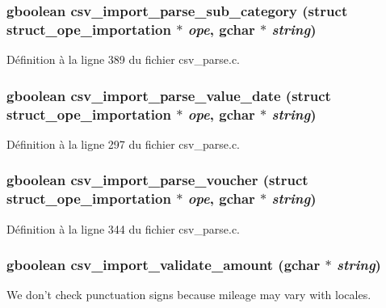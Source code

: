 \subsubsection[{csv\_\-import\_\-parse\_\-sub\_\-category}]{\setlength{\rightskip}{0pt plus 5cm}gboolean csv\_\-import\_\-parse\_\-sub\_\-category (struct {\bf struct\_\-ope\_\-importation} $\ast$ {\em ope}, \/  gchar $\ast$ {\em string})}\label{csv__parse_8h_a8c4113199a2089804857a46a6a117773}


Définition à la ligne 389 du fichier csv\_\-parse.c.

\subsubsection[{csv\_\-import\_\-parse\_\-value\_\-date}]{\setlength{\rightskip}{0pt plus 5cm}gboolean csv\_\-import\_\-parse\_\-value\_\-date (struct {\bf struct\_\-ope\_\-importation} $\ast$ {\em ope}, \/  gchar $\ast$ {\em string})}\label{csv__parse_8h_ab274b2fc3c8e2c33faae4489886ac9f5}


Définition à la ligne 297 du fichier csv\_\-parse.c.

\subsubsection[{csv\_\-import\_\-parse\_\-voucher}]{\setlength{\rightskip}{0pt plus 5cm}gboolean csv\_\-import\_\-parse\_\-voucher (struct {\bf struct\_\-ope\_\-importation} $\ast$ {\em ope}, \/  gchar $\ast$ {\em string})}\label{csv__parse_8h_a56e0a4574248f09bd6b73bc9c77793c8}


Définition à la ligne 344 du fichier csv\_\-parse.c.

\subsubsection[{csv\_\-import\_\-validate\_\-amount}]{\setlength{\rightskip}{0pt plus 5cm}gboolean csv\_\-import\_\-validate\_\-amount (gchar $\ast$ {\em string})}\label{csv__parse_8h_aee14878b526b7273e21e9be83df12a6f}
We don't check punctuation signs because mileage may vary with locales. 

